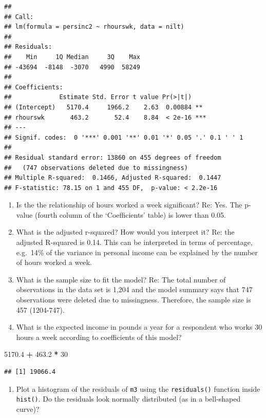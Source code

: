 \documentclass[
]{book}
\newenvironment{Shaded}{\begin{snugshade}}{\end{snugshade}}
\newcommand{\DecValTok}[1]{\textcolor[rgb]{0.00,0.00,0.81}{#1}}
\newcommand{\FloatTok}[1]{\textcolor[rgb]{0.00,0.00,0.81}{#1}}
\newcommand{\SpecialCharTok}[1]{\textcolor[rgb]{0.81,0.36,0.00}{\textbf{#1}}}
\providecommand{\tightlist}{%
  \setlength{\itemsep}{0pt}\setlength{\parskip}{0pt}}
\begin{document}
\begin{verbatim}
## 
## Call:
## lm(formula = persinc2 ~ rhourswk, data = nilt)
## 
## Residuals:
##    Min     1Q Median     3Q    Max 
## -43694  -8148  -3070   4990  58249 
## 
## Coefficients:
##             Estimate Std. Error t value Pr(>|t|)    
## (Intercept)   5170.4     1966.2    2.63  0.00884 ** 
## rhourswk       463.2       52.4    8.84  < 2e-16 ***
## ---
## Signif. codes:  0 '***' 0.001 '**' 0.01 '*' 0.05 '.' 0.1 ' ' 1
## 
## Residual standard error: 13860 on 455 degrees of freedom
##   (747 observations deleted due to missingness)
## Multiple R-squared:  0.1466, Adjusted R-squared:  0.1447 
## F-statistic: 78.15 on 1 and 455 DF,  p-value: < 2.2e-16
\end{verbatim}

\begin{enumerate}
\def\labelenumi{\arabic{enumi}.}
\setcounter{enumi}{2}
\tightlist
\item
  Is the the relationship of hours worked a week significant?
  Re: Yes. The p-value (fourth column of the `Coefficients' table) is lower than 0.05.
\item
  What is the adjusted r-squared? How would you interpret it?
  Re: the adjusted R-squared is 0.14. This can be interpreted in terms of percentage, e.g.~14\% of the variance in personal income can be explained by the number of hours worked a week.
\item
  What is the sample size to fit the model?
  Re: The total number of observations in the data set is 1,204 and the model summary says that 747 observations were deleted due to missingness. Therefore, the sample size is 457 (1204-747).
\item
  What is the expected income in pounds a year for a respondent who works 30 hours a week according to coefficients of this model?
\end{enumerate}

\begin{Shaded}
\begin{Highlighting}[]
\FloatTok{5170.4} \SpecialCharTok{+} \FloatTok{463.2} \SpecialCharTok{*} \DecValTok{30}
\end{Highlighting}
\end{Shaded}

\begin{verbatim}
## [1] 19066.4
\end{verbatim}

\begin{enumerate}
\def\labelenumi{\arabic{enumi}.}
\setcounter{enumi}{6}
\tightlist
\item
  Plot a histogram of the residuals of \texttt{m3} using the \texttt{residuals()} function inside \texttt{hist()}. Do the residuals look normally distributed (as in a bell-shaped curve)?
\end{enumerate}
\end{document}
